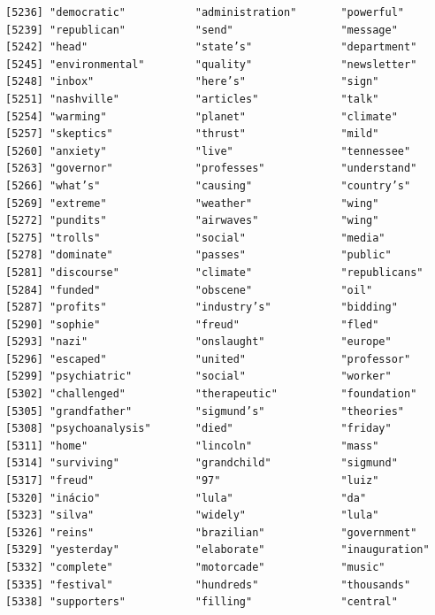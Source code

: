 \documentclass[
  letterpaper,
  DIV=11,
  numbers=noendperiod]{scrartcl}
\begin{document}
\begin{verbatim}
[5236] "democratic"           "administration"       "powerful"            
[5239] "republican"           "send"                 "message"             
[5242] "head"                 "state’s"              "department"          
[5245] "environmental"        "quality"              "newsletter"          
[5248] "inbox"                "here’s"               "sign"                
[5251] "nashville"            "articles"             "talk"                
[5254] "warming"              "planet"               "climate"             
[5257] "skeptics"             "thrust"               "mild"                
[5260] "anxiety"              "live"                 "tennessee"           
[5263] "governor"             "professes"            "understand"          
[5266] "what’s"               "causing"              "country’s"           
[5269] "extreme"              "weather"              "wing"                
[5272] "pundits"              "airwaves"             "wing"                
[5275] "trolls"               "social"               "media"               
[5278] "dominate"             "passes"               "public"              
[5281] "discourse"            "climate"              "republicans"         
[5284] "funded"               "obscene"              "oil"                 
[5287] "profits"              "industry’s"           "bidding"             
[5290] "sophie"               "freud"                "fled"                
[5293] "nazi"                 "onslaught"            "europe"              
[5296] "escaped"              "united"               "professor"           
[5299] "psychiatric"          "social"               "worker"              
[5302] "challenged"           "therapeutic"          "foundation"          
[5305] "grandfather"          "sigmund’s"            "theories"            
[5308] "psychoanalysis"       "died"                 "friday"              
[5311] "home"                 "lincoln"              "mass"                
[5314] "surviving"            "grandchild"           "sigmund"             
[5317] "freud"                "97"                   "luiz"                
[5320] "inácio"               "lula"                 "da"                  
[5323] "silva"                "widely"               "lula"                
[5326] "reins"                "brazilian"            "government"          
[5329] "yesterday"            "elaborate"            "inauguration"        
[5332] "complete"             "motorcade"            "music"               
[5335] "festival"             "hundreds"             "thousands"           
[5338] "supporters"           "filling"              "central"             

\end{verbatim}
\end{document}
